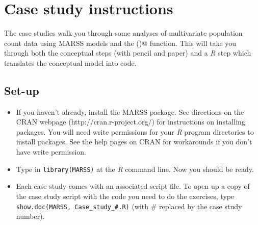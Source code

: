 \chapter{Case study instructions}
The case studies walk you through some  analyses of multivariate population count data using MARSS models and the \verb@MARSS()@ function.  This will take you through both the conceptual steps (with pencil and paper) and a \emph{R} step which translates the conceptual model into code. 

\section*{Set-up}
\begin{itemize}
\item If you haven't already, install the MARSS package.  See directions on the CRAN webpage (http://cran.r-project.org/) for instructions on installing packages.  You will need write permissions for your \emph{R} program directories to install packages.  See the help pages on CRAN for workarounds if you don't have write permission.
\item Type in \texttt{library(MARSS)} at the \emph{R} command line.  Now you should be ready.
\item Each case study comes with an associated script file. To open up a copy of the case study script with the code you need to do the exercises, type \texttt{show.doc(MARSS, Case\_study\_\#.R)} (with \# replaced by the case study number).
\end{itemize}

